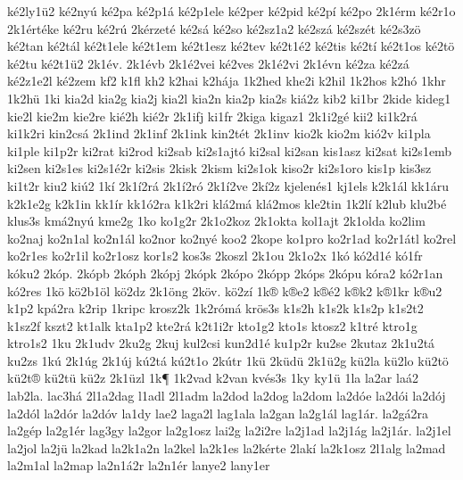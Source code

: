 {k^^e92ly1^^fc2
k^^e92ny^^fa
k^^e92pa
k^^e92p1^^e1
k^^e92p1ele
k^^e92per
k^^e92pid
k^^e92p^^ed
k^^e92po
2k1^^e9rm
k^^e92r1o
2k1^^e9rt^^e9ke
k^^e92ru
k^^e92r^^fa
2k^^e9rzet^^e9
k^^e92s^^e1
k^^e92so
k^^e92sz1a2
k^^e92sz^^e1
k^^e92sz^^e9t
k^^e92s3z^^f6
k^^e92tan
k^^e92t^^e1l
k^^e92t1ele
k^^e92t1em
k^^e92t1esz
k^^e92tev
k^^e92t1^^e92
k^^e92tis
k^^e92t^^ed
k^^e92t1os
k^^e92t^^f6
k^^e92tu
k^^e92t1^^fc2
2k1^^e9v.
2k1^^e9vb
2k1^^e92vei
k^^e92ves
2k1^^e92vi
2k1^^e9vn
k^^e92za
k^^e92z^^e1
k^^e92z1e2l
k^^e92zem
kf2
k1fl
kh2
k2hai
k2h^^e1ja
1k2hed
khe2i
k2hil
1k2hos
k2h^^f3
1khr
1k2h^^fc
1ki
kia2d
kia2g
kia2j
kia2l
kia2n
kia2p
kia2s
ki^^e12z
kib2
ki1br
2kide
kideg1
kie2l
kie2m
kie2re
ki^^e92h
ki^^e92r
2k1ifj
ki1fr
2kiga
kigaz1
2k1i2g^^e9
kii2
ki1k2r^^e1
ki1k2ri
kin2cs^^e1
2k1ind
2k1inf
2k1ink
kin2t^^e9t
2k1inv
kio2k
kio2m
ki^^f32v
ki1pla
ki1ple
ki1p2r
ki2rat
ki2rod
ki2sab
ki2s1ajt^^f3
ki2sal
ki2san
kis1asz
ki2sat
ki2s1emb
ki2sen
ki2s1es
ki2s1^^e92r
ki2sis
2kisk
2kism
ki2s1ok
kiso2r
ki2s1oro
kis1p
kis3sz
ki1t2r
kiu2
ki^^fa2
1k^^ed
2k1^^ed2r^^e1
2k1^^ed2r^^f3
2k1^^ed2ve
2k^^ed2z
kjelen^^e9s1
kj1els
k2k1^^e1l
kk1^^e1ru
k2k1e2g
k2k1in
kk1^^edr
kk1^^f32ra
k1k2ri
kl^^e12m^^e1
kl^^e12mos
kle2tin
1k2l^^ed
k2lub
klu2b^^e9
klus3s
km^^e12ny^^fa
kme2g
1ko
ko1g2r
2k1o2koz
2k1okta
kol1ajt
2k1olda
ko2lim
ko2naj
ko2n1al
ko2n1^^e1l
ko2nor
ko2ny^^e9
koo2
2kope
ko1pro
ko2r1ad
ko2r1^^e1tl
ko2rel
ko2r1es
ko2r1il
ko2r1osz
kor1s2
kos3s
2koszl
2k1ou
2k1o2x
1k^^f3
k^^f32d1^^e9
k^^f31fr
k^^f3ku2
2k^^f3p.
2k^^f3pb
2k^^f3ph
2k^^f3pj
2k^^f3pk
2k^^f3po
2k^^f3pp
2k^^f3ps
2k^^f3pu
k^^f3ra2
k^^f32r1an
k^^f32res
1k^^f6
k^^f62b1^^f6l
k^^f62dz
2k1^^f6ng
2k^^f6v.
k^^f62z^^ed
1k^^ae
k^^aee2
k^^ae^^e92
k^^aek2
k^^ae1kr
k^^aeu2
k1p2
kp^^e12ra
k2rip
1kripc
krosz2k
1k2r^^f3m^^e1
kr^^f6s3s
k1s2h
k1s2k
k1s2p
k1s2t2
k1sz2f
kszt2
kt1alk
kta1p2
kte2r^^e1
k2t1i2r
kto1g2
kto1s
ktosz2
k1tr^^e9
ktro1g
ktro1s2
1ku
2k1udv
2ku2g
2kuj
kul2csi
kun2d1^^e9
ku1p2r
ku2se
2kutaz
2k1u2t^^e1
ku2zs
1k^^fa
2k1^^fag
2k1^^faj
k^^fa2t^^e1
k^^fa2t1o
2k^^fatr
1k^^fc
2k^^fcd^^fc
2k1^^fc2g
k^^fc2la
k^^fc2lo
k^^fc2t^^f6
k^^fc2t^^ae
k^^fc2t^^fc
k^^fc2z
2k1^^fczl
1k^^b6
1k2vad
k2van
kv^^e9s3s
1ky
ky1^^fc
1la
la2ar
la^^e12
lab2la.
lac3h^^e1
2l1a2dag
l1adl
2l1adm
la2dod
la2dog
la2dom
la2d^^f3e
la2d^^f3i
la2d^^f3j
la2d^^f3l
la2d^^f3r
la2d^^f3v
la1dy
lae2
laga2l
lag1ala
la2gan
la2g1^^e1l
lag1^^e1r.
la2g^^e12ra
la2g^^e9p
la2g1^^e9r
lag3gy
la2gor
la2g1osz
lai2g
la2i2re
la2j1ad
la2j1^^e1g
la2j1^^e1r.
la2j1el
la2jol
la2j^^fc
la2kad
la2k1a2n
la2kel
la2k1es
la2k^^e9rte
2lak^^ed
la2k1osz
2l1alg
la2mad
la2m1al
la2map
la2n1^^e12r
la2n1^^e9r
lanye2
lany1er
}
